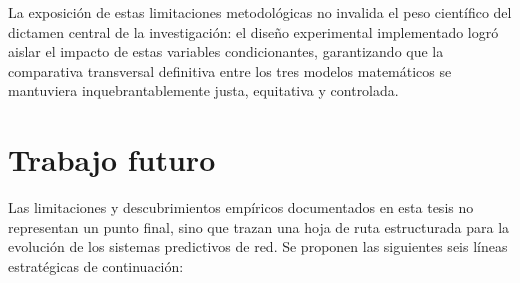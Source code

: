 \documentclass[12pt]{report}
\begin{document}
La exposición de estas limitaciones metodológicas no invalida el peso científico del dictamen central de la investigación: el diseño experimental implementado logró aislar el impacto de estas variables condicionantes, garantizando que la comparativa transversal definitiva entre los tres modelos matemáticos se mantuviera inquebrantablemente justa, equitativa y controlada.

\section{Trabajo futuro}
\label{sec:trabajo_futuro}

Las limitaciones y descubrimientos empíricos documentados en esta tesis no representan un punto final, sino que trazan una hoja de ruta estructurada para la evolución de los sistemas predictivos de red. Se proponen las siguientes seis líneas estratégicas de continuación:
\end{document}
